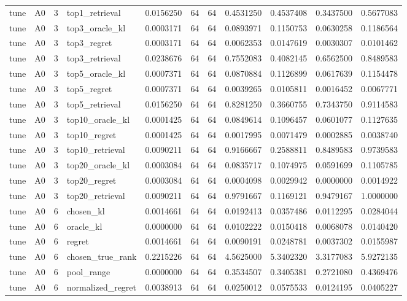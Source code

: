 \begin{tabular}{llrlrrrrrrr}
tune & A0 & 3 & top1_retrieval & 0.0156250 & 64 & 64 & 0.4531250 & 0.4537408 & 0.3437500 & 0.5677083 \\
tune & A0 & 3 & top3_oracle_kl & 0.0003171 & 64 & 64 & 0.0893971 & 0.1150753 & 0.0630258 & 0.1186564 \\
tune & A0 & 3 & top3_regret & 0.0003171 & 64 & 64 & 0.0062353 & 0.0147619 & 0.0030307 & 0.0101462 \\
tune & A0 & 3 & top3_retrieval & 0.0238676 & 64 & 64 & 0.7552083 & 0.4082145 & 0.6562500 & 0.8489583 \\
tune & A0 & 3 & top5_oracle_kl & 0.0007371 & 64 & 64 & 0.0870884 & 0.1126899 & 0.0617639 & 0.1154478 \\
tune & A0 & 3 & top5_regret & 0.0007371 & 64 & 64 & 0.0039265 & 0.0105811 & 0.0016452 & 0.0067771 \\
tune & A0 & 3 & top5_retrieval & 0.0156250 & 64 & 64 & 0.8281250 & 0.3660755 & 0.7343750 & 0.9114583 \\
tune & A0 & 3 & top10_oracle_kl & 0.0001425 & 64 & 64 & 0.0849614 & 0.1096457 & 0.0601077 & 0.1127635 \\
tune & A0 & 3 & top10_regret & 0.0001425 & 64 & 64 & 0.0017995 & 0.0071479 & 0.0002885 & 0.0038740 \\
tune & A0 & 3 & top10_retrieval & 0.0090211 & 64 & 64 & 0.9166667 & 0.2588811 & 0.8489583 & 0.9739583 \\
tune & A0 & 3 & top20_oracle_kl & 0.0003084 & 64 & 64 & 0.0835717 & 0.1074975 & 0.0591699 & 0.1105785 \\
tune & A0 & 3 & top20_regret & 0.0003084 & 64 & 64 & 0.0004098 & 0.0029942 & 0.0000000 & 0.0014922 \\
tune & A0 & 3 & top20_retrieval & 0.0090211 & 64 & 64 & 0.9791667 & 0.1169121 & 0.9479167 & 1.0000000 \\
tune & A0 & 6 & chosen_kl & 0.0014661 & 64 & 64 & 0.0192413 & 0.0357486 & 0.0112295 & 0.0284044 \\
tune & A0 & 6 & oracle_kl & 0.0000000 & 64 & 64 & 0.0102222 & 0.0150418 & 0.0068078 & 0.0140420 \\
tune & A0 & 6 & regret & 0.0014661 & 64 & 64 & 0.0090191 & 0.0248781 & 0.0037302 & 0.0155987 \\
tune & A0 & 6 & chosen_true_rank & 0.2215226 & 64 & 64 & 4.5625000 & 5.3402320 & 3.3177083 & 5.9272135 \\
tune & A0 & 6 & pool_range & 0.0000000 & 64 & 64 & 0.3534507 & 0.3405381 & 0.2721080 & 0.4369476 \\
tune & A0 & 6 & normalized_regret & 0.0038913 & 64 & 64 & 0.0250012 & 0.0575533 & 0.0124195 & 0.0405227 \\

\end{tabular}
